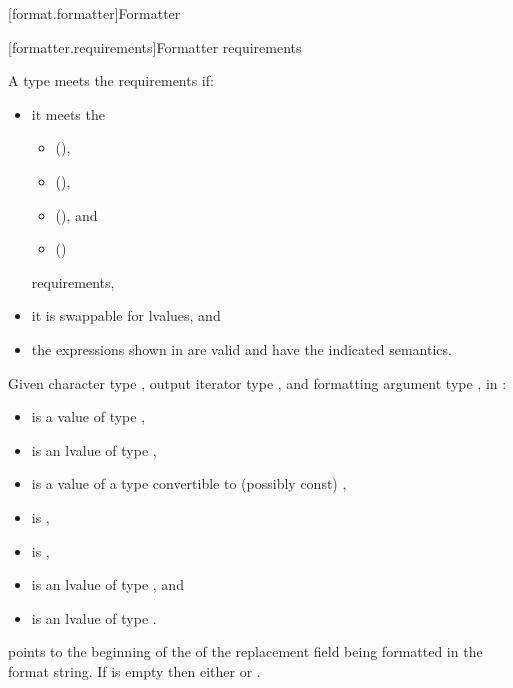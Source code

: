 [format.formatter]{Formatter}

[formatter.requirements]{Formatter requirements}

\pnum
A type  meets the  requirements if:
\begin{itemize}
\item
it meets the
\begin{itemize}
\item {} (),
\item {} (),
\item {} (), and
\item {} ()
\end{itemize}
requirements,

\item
it is swappable for lvalues, and

\item
the expressions shown in  are valid and
have the indicated semantics.
\end{itemize}

\pnum
Given character type , output iterator type
, and formatting argument type ,
in :
\begin{itemize}
\item {} is a value of type ,
\item {} is an lvalue of type ,
\item {} is a value of a type convertible to (possibly const) ,
\item {} is ,
\item {} is ,
\item {} is an lvalue of type , and
\item {} is an lvalue of type .
\end{itemize}
 points to the beginning of the
of the replacement field being formatted
in the format string.
If  is empty then either
 or
.

